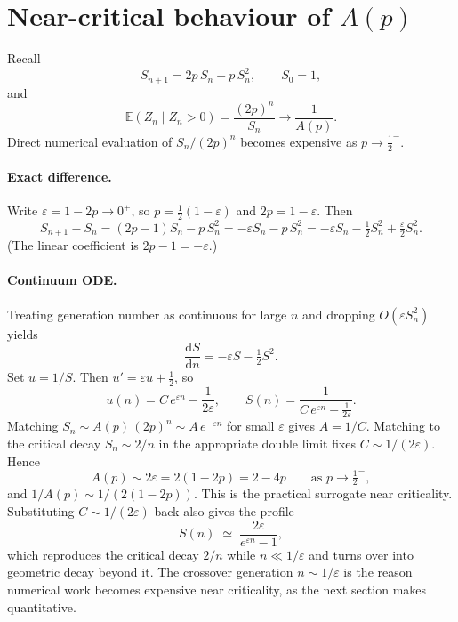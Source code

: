 \documentclass[11pt]{article}
\begin{document}
\section{Near-critical behaviour of \texorpdfstring{$A(p)$}{A(p)}}
\label{sec:nearcrit}

Recall
\[
S_{n+1}=2p\,S_n-p\,S_n^2,\qquad S_0=1,
\]
and
\[
\mathbb{E}(Z_n\mid Z_n>0)=\frac{(2p)^n}{S_n}\to\frac{1}{A(p)} .
\]
Direct numerical evaluation of $S_n/(2p)^n$ becomes expensive as $p\to\tfrac12^-$.

\paragraph{Exact difference.}
Write $\varepsilon=1-2p\to0^+$, so $p=\tfrac12(1-\varepsilon)$ and $2p=1-\varepsilon$. Then
\begin{equation}
S_{n+1}-S_n
=
(2p-1)S_n-p\,S_n^2
=
-\varepsilon S_n-p\,S_n^2
=
-\varepsilon S_n-\tfrac12 S_n^2+\tfrac{\varepsilon}{2}S_n^2.
\end{equation}
(The linear coefficient is $2p-1=-\varepsilon$.)

\paragraph{Continuum ODE.}
Treating generation number as continuous for large $n$ and dropping $O(\varepsilon S_n^2)$ yields
\begin{equation}
\frac{\mathrm{d}S}{\mathrm{d}n}
=
-\varepsilon S-\tfrac12 S^2.
\end{equation}
Set $u=1/S$. Then $u'=\varepsilon u+\tfrac12$, so
\[
u(n)=C\,e^{\varepsilon n}-\frac{1}{2\varepsilon},
\qquad
S(n)=\frac{1}{C\,e^{\varepsilon n}-\frac{1}{2\varepsilon}}.
\]
Matching $S_n\sim A(p)\,(2p)^n\sim A\,e^{-\varepsilon n}$ for small $\varepsilon$ gives $A=1/C$. Matching to the critical decay $S_n\sim 2/n$ in the appropriate double limit fixes $C\sim 1/(2\varepsilon)$. Hence
\begin{equation}
A(p)\sim 2\varepsilon = 2(1-2p)=2-4p
\qquad\text{as }p\to\tfrac12^-,
\end{equation}
and $1/A(p)\sim 1/(2(1-2p))$. This is the practical surrogate near criticality.
Substituting $C\sim1/(2\varepsilon)$ back also gives the profile
\begin{equation}
S(n)\;\simeq\;\frac{2\varepsilon}{e^{\varepsilon n}-1},
\label{eq:nearcrit-profile}
\end{equation}
which reproduces the critical decay $2/n$ while $n\ll1/\varepsilon$ and turns over
into geometric decay beyond it. The crossover generation $n\sim1/\varepsilon$ is the
reason numerical work becomes expensive near criticality, as the next section makes
quantitative.
\end{document}

